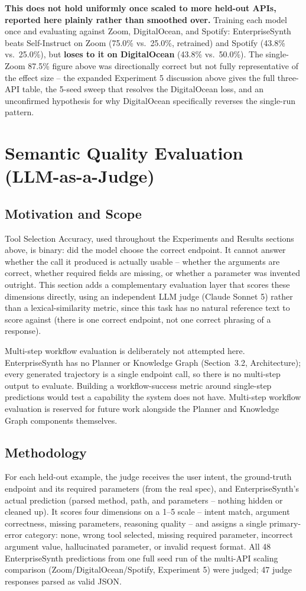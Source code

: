 \documentclass[letterpaper]{article} %
\begin{document}
\textbf{This does not hold uniformly once scaled to more held-out APIs, reported here plainly
rather than smoothed over.} Training each model once and evaluating against Zoom, DigitalOcean,
and Spotify: EnterpriseSynth beats Self-Instruct on Zoom (75.0\% vs.\ 25.0\%, retrained) and
Spotify (43.8\% vs.\ 25.0\%), but \textbf{loses to it on DigitalOcean} (43.8\% vs.\ 50.0\%). The
single-Zoom 87.5\% figure above was directionally correct but not fully representative of the
effect size -- the expanded Experiment 5 discussion above gives the full three-API table, the
5-seed sweep that resolves the DigitalOcean loss, and an unconfirmed hypothesis for why
DigitalOcean specifically reverses the single-run pattern.

\section{Semantic Quality Evaluation (LLM-as-a-Judge)}

\subsection{Motivation and Scope}
Tool Selection Accuracy, used throughout the Experiments and Results sections above, is binary:
did the model choose the correct endpoint. It cannot answer whether the call it
produced is actually usable -- whether the arguments are correct, whether required fields are
missing, or whether a parameter was invented outright. This section adds a complementary
evaluation layer that scores these dimensions directly, using an independent LLM judge (Claude
Sonnet 5) rather than a lexical-similarity metric, since this task has no natural reference text
to score against (there is one correct endpoint, not one correct phrasing of a response).

Multi-step workflow evaluation is deliberately not attempted here. EnterpriseSynth has no Planner
or Knowledge Graph (Section~3.2, Architecture); every generated trajectory is a single
endpoint call, so there is no multi-step output to evaluate. Building a workflow-success metric
around single-step predictions would test a capability the system does not have. Multi-step
workflow evaluation is reserved for future work alongside the Planner and Knowledge Graph
components themselves.

\subsection{Methodology}
For each held-out example, the judge receives the user intent, the ground-truth endpoint and its
required parameters (from the real spec), and EnterpriseSynth's actual prediction (parsed method,
path, and parameters -- nothing hidden or cleaned up). It scores four dimensions on a 1--5 scale
-- intent match, argument correctness, missing parameters, reasoning quality -- and assigns a
single primary-error category: none, wrong tool selected, missing required parameter, incorrect
argument value, hallucinated parameter, or invalid request format. All 48 EnterpriseSynth
predictions from one full seed run of the multi-API scaling comparison
(Zoom/DigitalOcean/Spotify, Experiment 5) were judged; 47 judge responses parsed as valid JSON.
\end{document}

